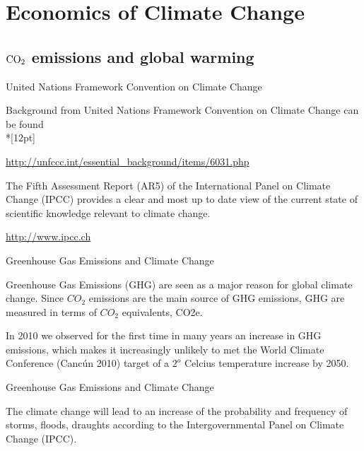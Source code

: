 \section{Economics of Climate Change}
\subsection[Emissions]{$\textnormal{CO}_2$ emissions and global warming}

{United Nations Framework Convention on Climate Change}

Background from United Nations Framework Convention on Climate Change can be found\\*[12pt]

\url{http://unfccc.int/essential_background/items/6031.php}

\vspace{12pt}
The Fifth Assessment Report (AR5) of the International Panel on Climate Change (IPCC) provides a clear and most up to date view of the current state of scientific knowledge relevant to climate change.

\url{http://www.ipcc.ch}

{Greenhouse Gas Emissions and Climate Change}






	Greenhouse Gas Emissions (GHG) are seen as a major reason for global climate change. Since ${CO}_2$ emissions are the main source of GHG emissions, GHG are measured in terms of ${CO}_2$ equivalents, CO2e.

	In 2010 we observed for the first time in many years an increase in GHG emissions, which makes it increasingly unlikely to met the World Climate Conference (Canc{\'u}n 2010) target of a $2^o$ Celcius temperature increase by 2050.






{Greenhouse Gas Emissions and Climate Change}






	The climate change will lead to an increase of the probability and frequency of storms, floods, draughts according to the Intergovernmental Panel on Climate Change (IPCC).


